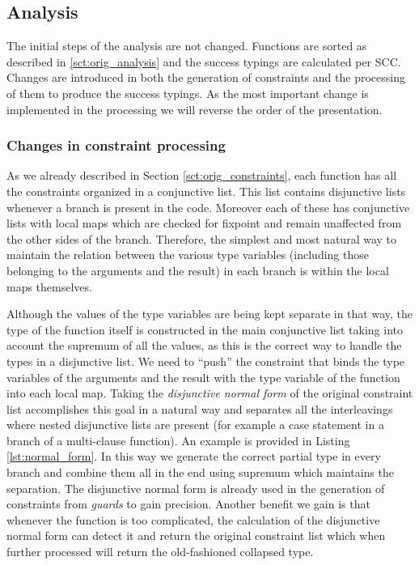 \subsection{Analysis}
\label{sct:intersection_analysis}

The initial steps of the analysis are not changed. Functions are
sorted as described in \ref{sct:orig_analysis} and the success typings
are calculated per SCC. Changes are introduced in both the generation
of constraints and the processing of them to produce the success
typings. As the most important change is implemented in the processing
we will reverse the order of the presentation.

\subsubsection{Changes in constraint processing}
\label{sct:intersect_constr_process}

As we already described in Section \ref{sct:orig_constraints}, each
function has all the constraints organized in a conjunctive list. This
list contains disjunctive lists whenever a branch is present in the
code. Moreover each of these has conjunctive lists with local maps
which are checked for fixpoint and remain unaffected from the other
sides of the branch. Therefore, the simplest and most natural way to
maintain the relation between the various type variables (including
those belonging to the arguments and the result) in each branch is
within the local maps themselves.

Although the values of the type variables are being kept separate in
that way, the type of the function itself is constructed in the main
conjunctive list taking into account the supremum of all the values,
as this is the correct way to handle the types in a disjunctive
list. We need to ``push'' the constraint that binds the type variables
of the arguments and the result with the type variable of the function
into each local map. Taking the \emph{disjunctive normal form} of the
original constraint list accomplishes this goal in a natural way and
separates all the interleavings where nested disjunctive lists are
present (for example a case statement in a branch of a multi-clause
function). An example is provided in Listing \ref{lst:normal_form}. In
this way we generate the correct partial type in every branch and
combine them all in the end using supremum which maintains the
separation. The disjunctive normal form is already used in the
generation of constraints from \emph{guards} to gain precision.
Another benefit we gain is that whenever the function is too
complicated, the calculation of the disjunctive normal form can detect
it and return the original constraint list which when further
processed will return the old-fashioned collapsed type.

